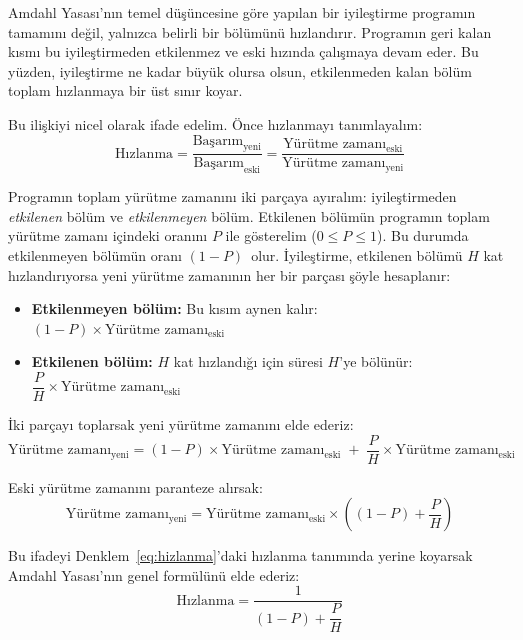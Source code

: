 Amdahl Yasası'nın temel düşüncesine göre yapılan bir iyileştirme programın tamamını değil, yalnızca belirli bir bölümünü hızlandırır. Programın geri kalan kısmı bu iyileştirmeden etkilenmez ve eski hızında çalışmaya devam eder. Bu yüzden, iyileştirme ne kadar büyük olursa olsun, etkilenmeden kalan bölüm toplam hızlanmaya bir üst sınır koyar.

Bu ilişkiyi nicel olarak ifade edelim. Önce hızlanmayı tanımlayalım:
\begin{equation}
\text{Hızlanma} = \frac{\text{Başarım}_{\text{yeni}}}{\text{Başarım}_{\text{eski}}} = \frac{\text{Yürütme zamanı}_{\text{eski}}}{\text{Yürütme zamanı}_{\text{yeni}}}
\label{eq:hizlanma}
\end{equation}

Programın toplam yürütme zamanını iki parçaya ayıralım: iyileştirmeden \emph{etkilenen} bölüm ve \emph{etkilenmeyen} bölüm. Etkilenen bölümün programın toplam yürütme zamanı içindeki oranını $P$ ile gösterelim ($0 \le P \le 1$). Bu durumda etkilenmeyen bölümün oranı $(1-P)$~olur. İyileştirme, etkilenen bölümü $H$ kat hızlandırıyorsa yeni yürütme zamanının her bir parçası şöyle hesaplanır:
\begin{itemize}
    \item \textbf{Etkilenmeyen bölüm:} Bu kısım aynen kalır: \quad $(1-P) \times \text{Yürütme zamanı}_{\text{eski}}$
    \item \textbf{Etkilenen bölüm:} $H$ kat hızlandığı için süresi $H$'ye bölünür: \quad $\dfrac{P}{H} \times \text{Yürütme zamanı}_{\text{eski}}$
\end{itemize}

İki parçayı toplarsak yeni yürütme zamanını elde ederiz:
\begin{equation}
\text{Yürütme zamanı}_{\text{yeni}} = (1 - P) \times \text{Yürütme zamanı}_{\text{eski}} \;+\; \frac{P}{H} \times \text{Yürütme zamanı}_{\text{eski}}
\end{equation}

Eski yürütme zamanını paranteze alırsak:
\begin{equation}
\text{Yürütme zamanı}_{\text{yeni}} = \text{Yürütme zamanı}_{\text{eski}} \times \left( (1 - P) + \frac{P}{H} \right)
\label{eq:amdahl-zaman}
\end{equation}

Bu ifadeyi Denklem~\ref{eq:hizlanma}'daki hızlanma tanımında yerine koyarsak Amdahl Yasası'nın genel formülünü elde ederiz:
\begin{equation}
\text{Hızlanma} = \frac{1}{(1-P) + \dfrac{P}{H}}
\label{eq:amdahl}
\end{equation}

